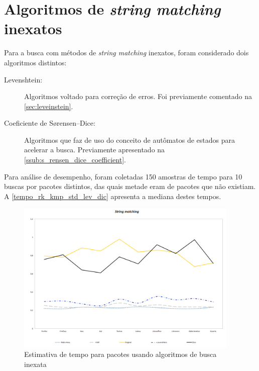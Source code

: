 \section{Algoritmos de \textit{string matching} inexatos} %
\label{sec:algor_timos_de_string_matching_inexatos}

Para a busca com métodos de \textit{string matching} inexatos, foram considerado dois algoritmos distintos:

\begin{description}
	\item[Levenshtein:] Algoritmos voltado para correção de erros. Foi previamente comentado na \autoref{sec:leveinstein}.
	\item[Coeficiente de Sørensen–Dice:] Algoritmos que faz de uso do conceito de autômatos de estados para acelerar a busca. Previamente apresentado na \autoref{ssub:s_rensen_dice_coefficient}.
\end{description}



Para análise de desempenho, foram coletadas 150 amostras de tempo para 10 buscas por pacotes distintos, das quais metade eram de pacotes que não existiam. A \autoref{tempo_rk_kmp_std_lev_dic} apresenta a mediana destes tempos.

\begin{figure}[htbp]
  \centering
  \includegraphics[width=0.95\textwidth]{figuras/tempo-rk_kmp_std_lev_dice}
  \caption{Estimativa de tempo para pacotes usando algoritmos de busca inexata}
  \label{tempo_rk_kmp_std_lev_dic}
\end{figure}

